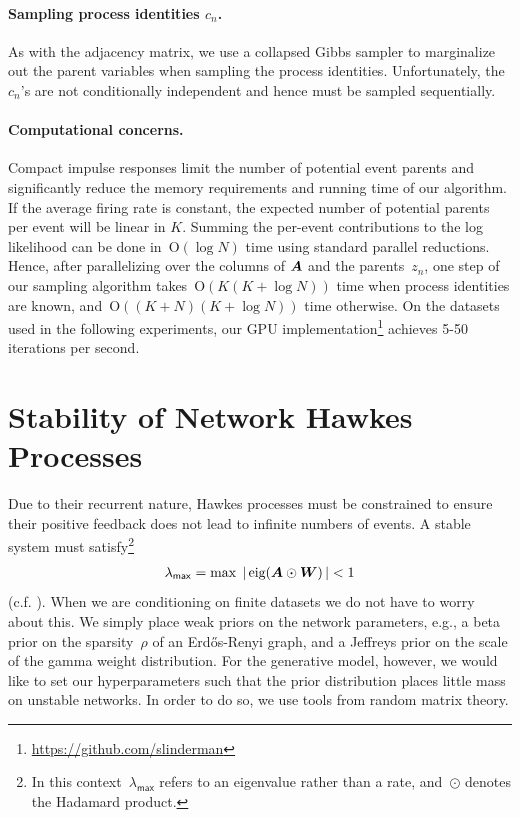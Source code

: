 \paragraph{Sampling process identities $c_n$.}
As with the adjacency matrix, we use a collapsed Gibbs sampler to marginalize out the parent variables when sampling the process identities. Unfortunately, the~$c_n$'s are not conditionally independent and hence must be sampled sequentially. 

\paragraph{Computational concerns.}
Compact impulse responses limit the number of potential event parents and significantly reduce the memory requirements and running time of our algorithm. If the average firing rate is constant, the expected number of potential parents per event will be linear in $K$. Summing the per-event contributions to the log likelihood can be done in~${\mathrm{O}(\log N)}$ time using standard parallel reductions. Hence, after parallelizing over the columns of $\boldsymbol{A}$ and the parents~$z_n$, one step of our sampling algorithm takes~${\mathrm{O}(K(K+\log N))}$ time when process identities are known, and~${\mathrm{O}((K+N)(K+\log N))}$ time otherwise. On the datasets used in the following experiments, our GPU implementation\footnote{\url{https://github.com/slinderman}} achieves 5-50 iterations per second.

\section{Stability of Network Hawkes Processes}
\label{sec:stability}
Due to their recurrent nature, Hawkes processes must be constrained to ensure their positive feedback does not lead to infinite numbers of events. A stable system must satisfy\footnote{In this context~${\lambda_{\mathsf{max}}}$ refers to an eigenvalue rather than a rate, and~$\odot$ denotes the Hadamard product.}
\begin{align*}
  \lambda_{\mathsf{max}}=\max\; |\,\text{eig}(\boldsymbol{A}\odot\boldsymbol{W})\,| < 1
\end{align*}
(c.f. \citet{Daley-1988}). When we are conditioning on finite datasets we do not have to worry about this. We simply place weak priors on the network parameters, e.g., a beta prior on the sparsity~${\rho}$ of an Erd\H{o}s-Renyi graph, and a Jeffreys prior on the scale of the gamma weight distribution. For the generative model, however, we would like to set our hyperparameters such that the prior distribution places little mass on unstable networks. In order to do so, we use tools from random matrix theory. 

